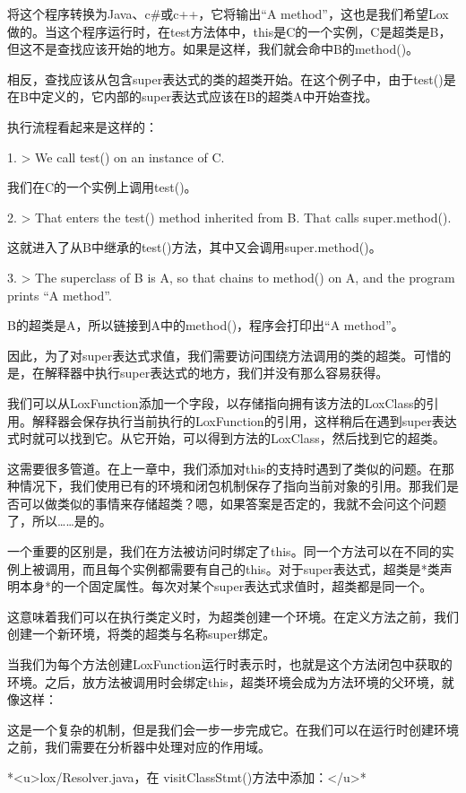 \documentclass[cn,11pt,chinese]{elegantbook}
\begin{document}
将这个程序转换为Java、c\#或c++，它将输出“A method”，这也是我们希望Lox做的。当这个程序运行时，在test方法体中，this是C的一个实例，C是超类是B，但这不是查找应该开始的地方。如果是这样，我们就会命中B的method()。

相反，查找应该从包含super表达式的类的超类开始。在这个例子中，由于test()是在B中定义的，它内部的super表达式应该在B的超类A中开始查找。

执行流程看起来是这样的：

1. > We call test() on an instance of C.

   我们在C的一个实例上调用test()。

2. > That enters the test() method inherited from B. That calls super.method().

   这就进入了从B中继承的test()方法，其中又会调用super.method()。

3. > The superclass of B is A, so that chains to method() on A, and the program prints “A method”.

   B的超类是A，所以链接到A中的method()，程序会打印出“A method”。

因此，为了对super表达式求值，我们需要访问围绕方法调用的类的超类。可惜的是，在解释器中执行super表达式的地方，我们并没有那么容易获得。

我们可以从LoxFunction添加一个字段，以存储指向拥有该方法的LoxClass的引用。解释器会保存执行当前执行的LoxFunction的引用，这样稍后在遇到super表达式时就可以找到它。从它开始，可以得到方法的LoxClass，然后找到它的超类。

这需要很多管道。在上一章中，我们添加对this的支持时遇到了类似的问题。在那种情况下，我们使用已有的环境和闭包机制保存了指向当前对象的引用。那我们是否可以做类似的事情来存储超类？嗯，如果答案是否定的，我就不会问这个问题了，所以……是的。

一个重要的区别是，我们在方法被访问时绑定了this。同一个方法可以在不同的实例上被调用，而且每个实例都需要有自己的this。对于super表达式，超类是*类声明本身*的一个固定属性。每次对某个super表达式求值时，超类都是同一个。

这意味着我们可以在执行类定义时，为超类创建一个环境。在定义方法之前，我们创建一个新环境，将类的超类与名称super绑定。

当我们为每个方法创建LoxFunction运行时表示时，也就是这个方法闭包中获取的环境。之后，放方法被调用时会绑定this，超类环境会成为方法环境的父环境，就像这样：

这是一个复杂的机制，但是我们会一步一步完成它。在我们可以在运行时创建环境之前，我们需要在分析器中处理对应的作用域。

*<u>lox/Resolver.java，在 visitClassStmt()方法中添加：</u>*
\end{document}
